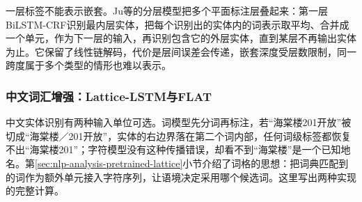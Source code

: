 一层标签不能表示嵌套。Ju等的分层模型把多个平面标注层叠起来：第一层BiLSTM-CRF识别最内层实体，把每个识别出的实体内的词表示取平均、合并成一个单元，作为下一层的输入，再识别包含它的外层实体，直到某层不再输出实体为止。它保留了线性链解码，代价是层间误差会传递，嵌套深度受层数限制，同一跨度属于多个类型的情形也难以表示。

\subsubsection{中文词汇增强：Lattice-LSTM与FLAT}
\label{sec:nlp-extraction-lattice}

中文实体识别有两种输入单位可选。词模型先分词再标注，若“海棠楼201开放”被切成“海棠楼／201开放”，实体的右边界落在第二个词内部，任何词级标签都恢复不出“海棠楼201”；字符模型没有这种传播错误，却看不到“海棠楼”是一个已知地名。第\ref{sec:nlp-analysis-pretrained-lattice}小节介绍了词格的思想：把词典匹配到的词作为额外单元接入字符序列，让语境决定采用哪个候选词。这里写出两种实现的完整计算。

